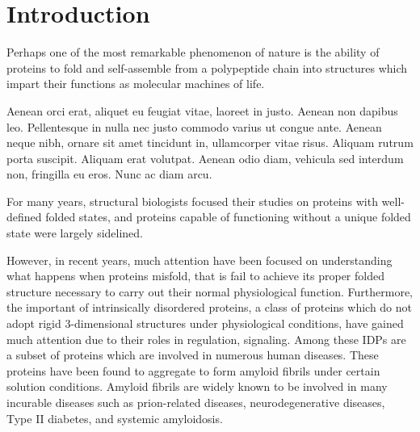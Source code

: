 \chapter{Introduction}


% 

Perhaps one of the most remarkable phenomenon of nature is the ability of proteins to fold and self-assemble from a polypeptide chain into structures which impart their functions as molecular machines of life.


Aenean orci erat, aliquet eu feugiat vitae, laoreet in justo. Aenean non dapibus leo. Pellentesque in nulla nec justo commodo varius ut congue ante. Aenean neque nibh, ornare sit amet tincidunt in, ullamcorper vitae risus. Aliquam rutrum porta suscipit. Aliquam erat volutpat. Aenean odio diam, vehicula sed interdum non, fringilla eu eros. Nunc ac diam arcu.


For many years, structural biologists focused their studies on proteins with well-defined folded states, and proteins capable of functioning without a unique folded state were largely sidelined.

However, in recent years, much attention have been focused on understanding what happens when proteins misfold, that is fail to achieve its proper folded structure necessary to carry out their normal physiological function.  Furthermore, the important of intrinsically disordered proteins, a class of proteins which do not adopt rigid 3-dimensional structures under physiological conditions, have gained much attention due to their roles in regulation, signaling.   Among these IDPs are a subset of proteins which are involved in numerous human diseases.  These proteins have been found to aggregate to form amyloid fibrils under certain solution conditions. Amyloid fibrils are widely known to be involved in many incurable diseases such as prion-related diseases, neurodegenerative diseases, Type II diabetes, and systemic amyloidosis. 


